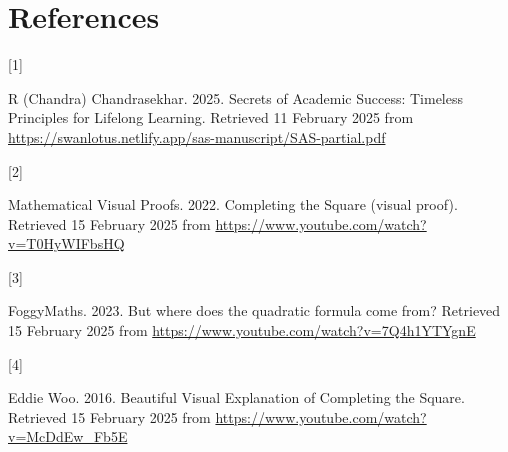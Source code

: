 \documentclass[
  a4paper,
]{article}
\newlength{\cslhangindent}
\newlength{\csllabelwidth}
\newenvironment{CSLReferences}[2] %
 {\begin{list}{}{%
  \setlength{\itemindent}{0pt}
  \setlength{\leftmargin}{0pt}
  \setlength{\parsep}{0pt}
  \ifodd #1
   \setlength{\leftmargin}{\cslhangindent}
   \setlength{\itemindent}{-1\cslhangindent}
  \fi
  \setlength{\itemsep}{#2\baselineskip}}}
 {\end{list}}
\newcommand{\CSLLeftMargin}[1]{\parbox[t]{\csllabelwidth}{\strut#1\strut}}
\newcommand{\CSLRightInline}[1]{\parbox[t]{\linewidth - \csllabelwidth}{\strut#1\strut}}
\begin{document}
\section*{References}\label{bibliography}

\label{refs}
\begin{CSLReferences}{0}{0}
\CSLLeftMargin{{[}1{]} }%
\CSLRightInline{R (Chandra) Chandrasekhar. 2025. {Secrets of Academic
Success}: {Timeless Principles for Lifelong Learning}. Retrieved 11
February 2025 from
\url{https://swanlotus.netlify.app/sas-manuscript/SAS-partial.pdf}}

\CSLLeftMargin{{[}2{]} }%
\CSLRightInline{Mathematical Visual Proofs. 2022. {Completing the Square
(visual proof)}. Retrieved 15 February 2025 from
\url{https://www.youtube.com/watch?v=T0HyWIFbsHQ}}

\CSLLeftMargin{{[}3{]} }%
\CSLRightInline{FoggyMaths. 2023. {But where does the quadratic formula
come from?} Retrieved 15 February 2025 from
\url{https://www.youtube.com/watch?v=7Q4h1YTYgnE}}

\CSLLeftMargin{{[}4{]} }%
\CSLRightInline{Eddie Woo. 2016.{ Beautiful Visual Explanation of
Completing the Square}. Retrieved 15 February 2025 from
\url{https://www.youtube.com/watch?v=McDdEw_Fb5E}}

\end{CSLReferences}
\end{document}
